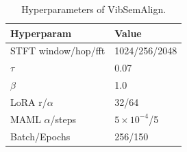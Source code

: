 \begin{table}[htbp]
\centering
\caption{Hyperparameters of VibSemAlign.}
\label{tab:II}
\begin{tabular}{@{}ll@{}}
\toprule
Hyperparam & Value \\
\midrule
STFT window/hop/fft & 1024/256/2048 \\
$\tau$ & 0.07 \\
$\beta$ & 1.0 \\
LoRA r/$\alpha$ & 32/64 \\
MAML $\alpha$/steps & $5\times10^{-4}$/5 \\
Batch/Epochs & 256/150 \\
\bottomrule
\end{tabular}
\end{table}
